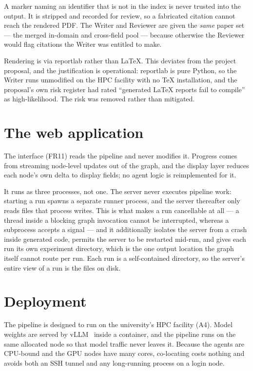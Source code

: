 A marker naming an identifier that is not in the index is never trusted into the output. It is
stripped and recorded for review, so a fabricated citation cannot reach the rendered PDF. The
Writer and Reviewer are given the \emph{same} paper set --- the merged in-domain and cross-field
pool --- because otherwise the Reviewer would flag citations the Writer was entitled to make.

Rendering is via reportlab rather than LaTeX. This deviates from the project proposal, and the
justification is operational: reportlab is pure Python, so the Writer runs unmodified on the
HPC facility with no TeX installation, and the proposal's own risk register had rated
``generated LaTeX reports fail to compile'' as high-likelihood. The risk was removed rather
than mitigated.

\section{The web application}
\label{sec:webapp}

The interface (FR11) reads the pipeline and never modifies it. Progress comes from streaming
node-level updates out of the graph, and the display layer reduces each node's own delta to
display fields; no agent logic is reimplemented for it.

It runs as three processes, not one. The server never executes pipeline work: starting a run
spawns a separate runner process, and the server thereafter only reads files that process
writes. This is what makes a run cancellable at all --- a thread inside a blocking graph
invocation cannot be interrupted, whereas a subprocess accepts a signal --- and it additionally
isolates the server from a crash inside generated code, permits the server to be restarted
mid-run, and gives each run its own experiment directory, which is the one output location the
graph itself cannot route per run. Each run is a self-contained directory, so the server's
entire view of a run is the files on disk.

\section{Deployment}
\label{sec:deployment}

The pipeline is designed to run on the university's HPC facility (A4). Model weights are served
by vLLM~\cite{kwon2023vllm} inside a container, and the pipeline runs on the same allocated
node so that model traffic never leaves it. Because the agents are CPU-bound and the GPU nodes
have many cores, co-locating costs nothing and avoids both an SSH tunnel and any long-running
process on a login node.

